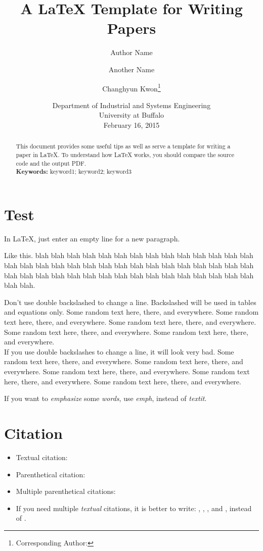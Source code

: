 \documentclass[letterpaper, 11pt]{article}
\title{A LaTeX Template for Writing Papers}
\author{Author Name \and Another Name \and Changhyun Kwon\footnote{Corresponding Author: \email{chkwon@buffalo.edu}}}
\date{Department of Industrial and Systems Engineering\\University at Buffalo\\[0.5cm] February 16, 2015}
\begin{document}
\maketitle

\begin{abstract}
This document provides some useful tips as well as serve a template for writing a paper in LaTeX. To understand how LaTeX works, you should compare the source code and the output PDF.\\
\noindent\textbf{Keywords:} keyword1; keyword2; keyword3
\end{abstract}



\section{Test} \label{sec:paragraph}
In LaTeX, just enter an empty line for a new paragraph.

Like this. blah blah blah blah blah blah blah blah blah blah blah blah blah blah blah blah blah blah blah blah blah blah blah blah blah blah blah blah blah blah blah blah blah blah blah blah blah blah blah blah blah blah blah blah blah blah blah blah.

Don't use double backslashed to change a line. Backslashed will be used in tables and equations only. Some random text here, there, and everywhere. Some random text here, there, and everywhere. Some random text here, there, and everywhere. Some random text here, there, and everywhere. Some random text here, there, and everywhere.  \\
If you use double backslashes to change a line, it will look very bad. Some random text here, there, and everywhere. Some random text here, there, and everywhere. Some random text here, there, and everywhere. Some random text here, there, and everywhere. Some random text here, there, and everywhere. 

If you want to \emph{emphasize} some \emph{words}, use \emph{emph}, instead of \textit{textit}.




\section{Citation} \label{sec:citation}

\begin{itemize}
\item Textual citation: \citet{Kwon2013rsp}
\item Parenthetical citation: \citep{Kwon2013rsp}
\item Multiple parenthetical citations: \citep{Bertsimas2004,Chaerani2005,Kouvelis1996,gabrel2012recent}
\item If you need multiple \emph{textual} citations, it is better to write: \citet{Bertsimas2004}, \citet{Chaerani2005}, \citet{Kouvelis1996}, and \citet{gabrel2012recent}, instead of \citet{Bertsimas2004,Chaerani2005,Kouvelis1996,gabrel2012recent}.

\end{itemize}
\end{document}
